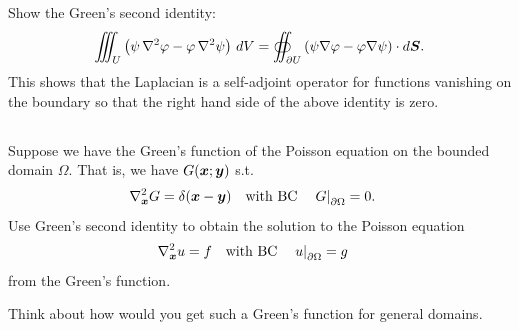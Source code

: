 \documentclass[11pt,letterpaper]{report}
\begin{document}
\subsection{}
Show the Green's second identity:
\begin{align}
    \iiint_U \left( \psi \, \nabla^2 \varphi - \varphi \, \nabla^2 \psi\right)\, dV = \oiint_{\partial U} \left( \psi \nabla \varphi - \varphi \nabla \psi\right)\cdot d\boldsymbol{S}.
\end{align}
This shows that the Laplacian is a self-adjoint operator for functions vanishing on the boundary so that the right hand side of the above identity is zero.

\subsection{}
Suppose we have the Green's function of the Poisson equation on the bounded domain $\Omega$. That is, we have $G(\boldsymbol{x};\boldsymbol{y})$ s.t.
\begin{align}
    &\nabla_{\boldsymbol{x}}^2 G = \delta(\boldsymbol{x}-\boldsymbol{y})\quad \mbox{with BC} \quad \left.G\right|_{\partial\Omega} = 0.
\end{align}
Use Green's second identity to obtain the solution to the Poisson equation
\begin{align}
    &\nabla_{\boldsymbol{x}}^2 u = f\quad \mbox{with BC} \quad \left.u\right|_{\partial\Omega} = g
\end{align}
from the Green's function.

Think about how would you get such a Green's function for general domains. 


\newpage
\printbibliography
\end{document}
